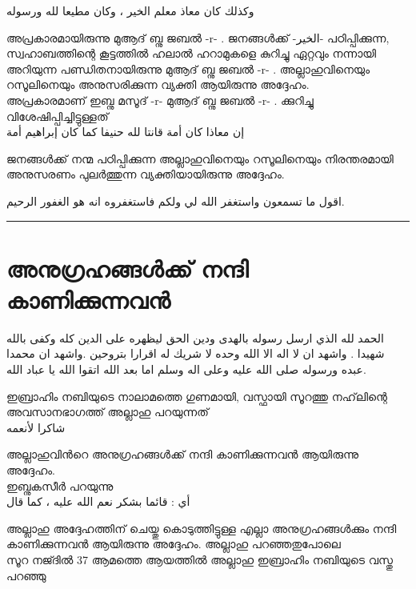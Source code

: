  
 \textarabic{وكذلك كان معاذ معلم الخير ، وكان مطيعا لله ورسوله}
 
 അപ്രകാരമായിരുന്നു മുആദ് ബ്നു ജബൽ -r- . 
 ജനങ്ങൾക്ക് -\textarabic{الخير}- പഠിപ്പിക്കുന്ന, 
 സ്വഹാബത്തിന്റെ കൂട്ടത്തിൽ ഹലാൽ ഹറാമുകളെ കുറിച്ചു ഏറ്റവും നന്നായി അറിയുന്ന പണ്ഡിതനായിരുന്നു മുആദ് ബ്നു ജബൽ -r- . 
 അല്ലാഹുവിനെയും റസൂലിനെയും അനുസരിക്കുന്ന വ്യക്തി ആയിരുന്നു അദ്ദേഹം. \\
 
 അപ്രകാരമാണ് ഇബ്നു മസൂദ് -r- മുആദ് ബ്നു ജബൽ -r- .  ക്കുറിച്ചു വിശേഷിപ്പിച്ചിട്ടുള്ളത് \\
 
  \textarabic{ إن معاذا كان أمة قانتا لله حنيفا كما كان إبراهيم أمة}
 
 ജനങ്ങൾക്ക് നന്മ പഠിപ്പിക്കുന്ന അല്ലാഹുവിനെയും റസൂലിനെയും നിരന്തരമായി അനുസരണം പുലർത്തുന്ന വ്യക്തിയായിരുന്നു അദ്ദേഹം. \\
 
 \begin{center}


 \textarabic{اقول ما تسمعون واستغفر الله لي ولكم فاستغفروه انه هو الغفور الرحيم.} \\ 
   \end{center}
 	\hrule 
\pagebreak
 \section*{\textmalayalam{അനുഗ്രഹങ്ങൾക്ക് നന്ദി കാണിക്കുന്നവൻ}}
 
 \textarabic{	الحمد لله الذي ارسل رسوله بالهدى ودين الحق ليظهره على الدين كله وكفى بالله شهيدا . واشهد ان لا اله الا الله وحده لا شريك له اقرارا بتروحين  .واشهد ان محمدا عبده ورسوله صلى الله عليه وعلى اله وسلم اما بعد الله 	
 	اتقوا الله يا عباد الله. }
 
 
 
 
 ഇബ്രാഹിം നബിയുടെ നാലാമത്തെ ഗുണമായി, വസ്ഫായി സൂറത്തു നഹ്‌ലിന്റെ അവസാനഭാഗത്ത് അല്ലാഹു പറയുന്നത് \\
 
 
 \textarabic{شاكرا لأنعمه}
 
 അല്ലാഹുവിൻറെ അനുഗ്രഹങ്ങൾക്ക് നന്ദി കാണിക്കുന്നവൻ ആയിരുന്നു അദ്ദേഹം. \\
 
  ഇബ്നുകസീർ പറയുന്നു \\
  \textarabic{أي : قائما بشكر نعم الله عليه ، كما قال}
 
 അല്ലാഹു അദ്ദേഹത്തിന് ചെയ്തു കൊടുത്തിട്ടുള്ള എല്ലാ അനുഗ്രഹങ്ങൾക്കും നന്ദി കാണിക്കുന്നവൻ ആയിരുന്നു അദ്ദേഹം.  അല്ലാഹു പറഞ്ഞതുപോലെ \\
   \textarabic{\quranayah[53][37]} 
 സൂറ നജ്ദിൽ 37 ആമത്തെ ആയത്തിൽ അല്ലാഹു ഇബ്രാഹിം നബിയുടെ വസ്തു പറഞ്ഞു 
 

